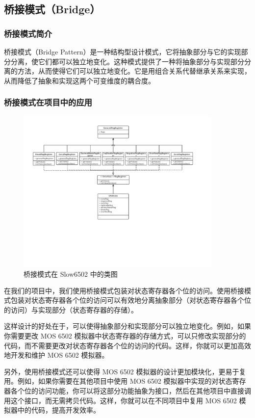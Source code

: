 \subsection{桥接模式（Bridge）}

\subsubsection{桥接模式简介}

桥接模式（Bridge Pattern）是一种结构型设计模式，它将抽象部分与它的实现部分分离，使它们都可以独立地变化。这种模式提供了一种将抽象部分与实现部分分离的方法，从而使得它们可以独立地变化。它是用组合关系代替继承关系来实现，从而降低了抽象和实现这两个可变维度的耦合度。

\subsubsection{桥接模式在项目中的应用}

\begin{figure}[htb]
  \centering
  \includegraphics[width=0.9\textwidth]{figures/Bridge.pdf}
  \caption{桥接模式在 Slow6502 中的类图}
\end{figure}

在我们的项目中，我们使用桥接模式包装对状态寄存器各个位的访问。使用桥接模式包装对状态寄存器各个位的访问可以有效地分离抽象部分（对状态寄存器各个位的访问）与实现部分（状态寄存器的存储）。

这样设计的好处在于，可以使得抽象部分和实现部分可以独立地变化。例如，如果你需要更改 MOS 6502 模拟器中状态寄存器的存储方式，可以只修改实现部分的代码，而不需要更改对状态寄存器各个位的访问的代码。这样，你就可以更加高效地开发和维护 MOS 6502 模拟器。

另外，使用桥接模式还可以使得 MOS 6502 模拟器的设计更加模块化，更易于复用。例如，如果你需要在其他项目中使用 MOS 6502 模拟器中实现的对状态寄存器各个位的访问功能，你可以将这部分功能抽象为接口，然后在其他项目中直接调用这个接口，而无需拷贝代码。这样，你就可以在不同项目中复用 MOS 6502 模拟器中的代码，提高开发效率。
